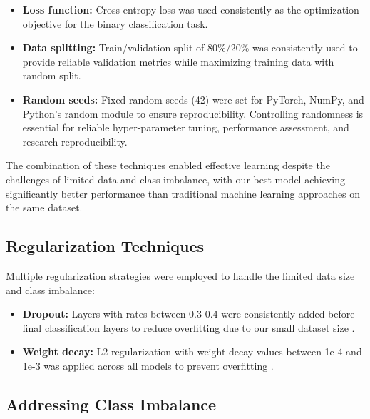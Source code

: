 \documentclass[a4paper,12pt]{report}
\begin{document}
\begin{itemize}

    \item \textbf{Loss function:} Cross-entropy loss was used consistently as the optimization objective for the binary classification task.
    
    \item \textbf{Data splitting:} Train/validation split of 80\%/20\% was consistently used to provide reliable validation metrics while maximizing training data with random split.
    
    \item \textbf{Random seeds:} Fixed random seeds (42) were set for PyTorch, NumPy, and Python's random module to ensure reproducibility. Controlling randomness is essential for reliable hyper-parameter tuning, performance assessment, and research reproducibility.

\end{itemize}

The combination of these techniques enabled effective learning despite the challenges of limited data and class imbalance, with our best model achieving significantly better performance than traditional machine learning approaches on the same dataset.

\subsection{Regularization Techniques}

Multiple regularization strategies were employed to handle the limited data size and class imbalance:

\begin{itemize}
    \item \textbf{Dropout:} Layers with rates between 0.3-0.4 were consistently added before final classification layers to reduce overfitting due to our small dataset size \citep{srivastava2014dropout}.
    \item \textbf{Weight decay:} L2 regularization with weight decay values between 1e-4 and 1e-3 was applied across all models to prevent overfitting \citep{krogh1992simple}.
    

\end{itemize}

\subsection{Addressing Class Imbalance}
\end{document}
